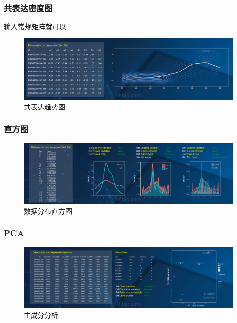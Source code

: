 \documentclass[]{article}
\numberwithin{figure}{section}
\numberwithin{table}{section}
\theoremstyle{definition}
\theoremstyle{definition}
\theoremstyle{definition}
\theoremstyle{remark}
\begin{document}
\subsubsection{\texorpdfstring{\href{http://mp.weixin.qq.com/s/ST2SAmfKOptpJOHS8podmQ}{共表达密度图}}{共表达密度图}}

输入常规矩阵就可以

\begin{figure}[H]

{\centering \includegraphics[width=0.95\linewidth,height=0.7\textheight,keepaspectratio]{images/density2d_1} 

}

\caption{共表达趋势图}\label{fig:unnamed-chunk-263}
\end{figure}

\subsubsection{直方图}

\begin{figure}[H]

{\centering \includegraphics[width=0.95\linewidth,height=0.7\textheight,keepaspectratio]{images/histogram_1} 

}

\caption{数据分布直方图}\label{fig:unnamed-chunk-264}
\end{figure}

\subsubsection{PCA}\label{pca-1}

\begin{figure}[H]

{\centering \includegraphics[width=0.95\linewidth,height=0.7\textheight,keepaspectratio]{images/pca_1} 

}

\caption{主成分分析}\label{fig:unnamed-chunk-265}
\end{figure}
\end{document}
